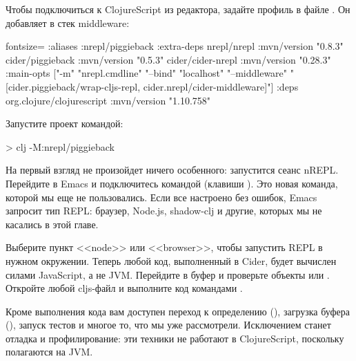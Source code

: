 \begin{figure}[H]
  \centering
  \resizebox{\columnwidth}{!}{}
  \label{fig:chart-repl-05}
\end{figure}

Чтобы подключиться к ClojureScript из редактора, задайте профиль  в файле . Он добавляет  в стек middleware:

\begin{english}
  \begin{clojure*}{fontsize=\small}
{:aliases
 {:nrepl/piggieback
  {:extra-deps
   {nrepl/nrepl {:mvn/version "0.8.3"}
    cider/piggieback {:mvn/version "0.5.3"}
    cider/cider-nrepl {:mvn/version "0.28.3"}}
   :main-opts
   ["-m" "nrepl.cmdline"
    "--bind" "localhost"
    "--middleware"
      "[cider.piggieback/wrap-cljs-repl,
        cider.nrepl/cider-middleware]"]}}
 :deps
 {org.clojure/clojurescript {:mvn/version "1.10.758"}}}
  \end{clojure*}
\end{english}

Запустите проект командой:

\begin{english}
  \begin{bash}
> clj -M:nrepl/piggieback
  \end{bash}
\end{english}

На первый взгляд не произойдет ничего особенного: запустится сеанс nREPL. Перейдите в Emacs и подключитесь командой  (клавиши ). Это новая команда, которой мы еще не пользовались. Если все настроено без ошибок, Emacs запросит тип REPL: браузер, Node.js, shadow-clj и другие, которых мы не касались в этой главе.

Выберите пункт <<node>> или <<browser>>, чтобы запустить REPL в нужном окружении. Теперь любой код, выполненный в Cider, будет вычислен силами JavaScript, а не JVM. Перейдите в буфер  и проверьте объекты  или . Откройте любой cljs-файл и выполните код командами .

Кроме выполнения кода вам доступен переход к определению (), загрузка буфера (), запуск тестов и многое то, что мы уже рассмотрели. Исключением станет отладка и профилирование: эти техники не работают в ClojureScript, поскольку полагаются на JVM.

